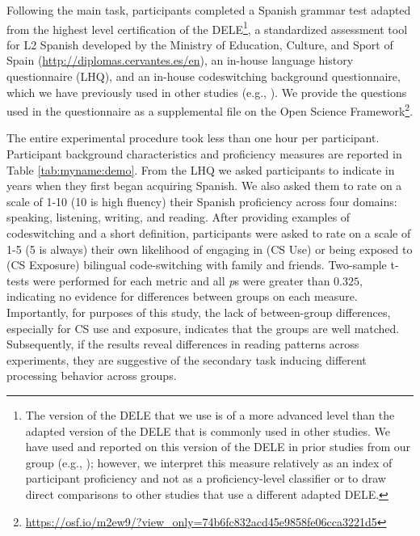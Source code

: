 \documentclass[output=paper,colorlinks,citecolor=brown]{langscibook}
\begin{document}
Following the main task, participants completed a Spanish grammar test adapted from the highest level certification of the DELE\footnote{The version of the DELE that we use is of a more advanced level than the adapted version of the DELE that is commonly used in other studies. We have used and reported on this version of the DELE in prior studies from our group (e.g., \cite{Dussiasetal2013,GuzzardoTamargoetal2016,ValdesKroffetal2017}); however, we interpret this measure relatively as an index of participant proficiency and not as a proficiency-level classifier or to draw direct comparisons to other studies that use a different adapted DELE.}, a standardized assessment tool for L2 Spanish developed by the Ministry of Education, Culture, and Sport of Spain (\url{http://diplomas.cervantes.es/en}), an in-house language history questionnaire (LHQ), and an in-house codeswitching background questionnaire, which we have previously used in other studies (e.g., \cite{GuzzardoTamargoetal2016,ValdesKroffetal2017}). We provide the questions used in the questionnaire as a supplemental file on the Open Science Framework\footnote{\url{https://osf.io/m2ew9/?view_only=74b6fc832acd45e9858fe06cca3221d5}}.

The entire experimental procedure took less than one hour per participant. Participant background characteristics and proficiency measures are reported in Table \ref{tab:myname:demo}. From the LHQ we asked participants to indicate in years when they first began acquiring Spanish. We also asked them to rate on a scale of 1-10 (10 is high fluency) their Spanish proficiency across four domains: speaking, listening, writing, and reading. After providing examples of codeswitching and a short definition, participants were asked to rate on a scale of 1-5 (5 is always) their own likelihood of engaging in (CS Use) or being exposed to (CS Exposure) bilingual code-switching with family and friends.  Two-sample t-tests were performed for each metric and all \textit{p}s were greater than $0.325$, indicating no evidence for differences between groups on each measure. Importantly, for purposes of this study, the lack of between-group differences, especially for CS use and exposure, indicates that the groups are well matched. Subsequently, if the results reveal differences in reading patterns across experiments, they are suggestive of the secondary task inducing different processing behavior across groups.
\end{document}
